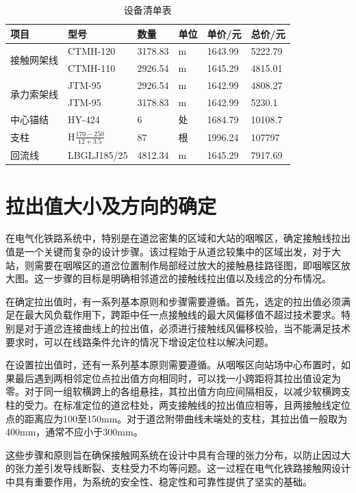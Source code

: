 \begin{table}[H]
	\caption{设备清单表}
	\label{tab:设备清单表}
	\centering
	\begin{tabular}{|l|l|l|l|l|l|}
		\hline
		项目                     & 型号          & 数量      & 单位 & 单价/元    & 总价/元    \\ \hline
		\multirow{2}{*}{接触网架线} & CTMH-120    & 3178.83 & m  & 1643.99 & 5222.79 \\ \cline{2-6} 
		& CTMH-110    & 2926.54 & m  & 1645.29 & 4815.01 \\ \hline
		\multirow{2}{*}{承力索架线} & JTM-95      & 2926.54 & m  & 1642.99 & 4808.27 \\ \cline{2-6} 
		& JTM-95      & 3178.83 & m  & 1642.99 & 5230.1  \\ \hline
		中心锚结                   & HY-424      & 6       & 处  & 1684.79 & 10108.7 \\ \hline
		支柱                     & $\mathrm{H}\frac{170-250}{12+3.5}$          & 87      & 根  & 1996.24 & 107797  \\ \hline
		回流线                    & LBGLJ185/25 & 4812.34 & m  & 1645.29 & 7917.69 \\ \hline
	\end{tabular}
\end{table}
\section{拉出值大小及方向的确定}

在电气化铁路系统中，特别是在道岔密集的区域和大站的咽喉区，确定接触线拉出值是一个关键而复杂的设计步骤。该过程始于从道岔较集中的区域出发，对于大站，则需要在咽喉区的道岔位置制作局部经过放大的接触悬挂路径图，即咽喉区放大图。这一步骤的目标是明确相邻道岔的接触线拉出值以及线岔的分布情况。

在确定拉出值时，有一系列基本原则和步骤需要遵循。首先，选定的拉出值必须满足在最大风负载作用下，跨距中任一点接触线的最大风偏移值不超过技术要求。特别是对于道岔连接曲线上的拉出值，必须进行接触线风偏移校验，当不能满足技术要求时，可以在线路条件允许的情况下增设定位柱以解决问题。

在设置拉出值时，还有一系列基本原则需要遵循。从咽喉区向站场中心布置时，如果最后遇到两相邻定位点拉出值方向相同时，可以找一小跨距将其拉出值设定为零。对于同一组软横跨上的各组悬挂，其拉出值方向应间隔相反，以减少软横跨支柱的受力。在标准定位的道岔柱处，两支接触线的拉出值应相等，且两接触线定位点的距离应为100至150mm。对于道岔附带曲线未端处的支柱，其拉出值一般取为400mm，通常不应小于300mm。

这些步骤和原则旨在确保接触网系统在设计中具有合理的张力分布，以防止因过大的张力差引发导线断裂、支柱受力不均等问题。这一过程在电气化铁路接触网设计中具有重要作用，为系统的安全性、稳定性和可靠性提供了坚实的基础。

